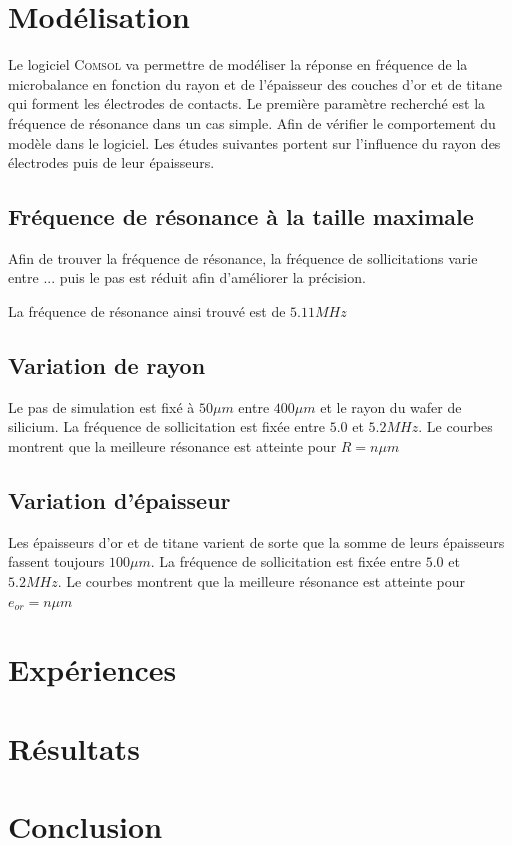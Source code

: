 \documentclass[a4paper,10pt]{article}
\begin{document}
\section{Modélisation}

Le logiciel \textsc{Comsol} va permettre de modéliser la réponse en fréquence de la microbalance en fonction du rayon et de l'épaisseur des couches d'or et de titane qui forment les électrodes de contacts.
Le première paramètre recherché est la fréquence de résonance dans un cas simple. Afin de vérifier le comportement du modèle dans le logiciel. Les études suivantes portent sur l'influence du rayon des électrodes puis de leur épaisseurs.
\subsection{Fréquence de résonance à la taille maximale}
Afin de trouver la fréquence de résonance, la fréquence de sollicitations varie entre ... puis le pas est réduit afin d'améliorer la précision.

La fréquence de résonance ainsi trouvé est de $5.11 MHz$
\subsection{Variation de rayon}

Le pas de simulation est fixé à $50 \mu m$ entre $400 \mu m$ et le rayon du wafer de silicium. La fréquence de sollicitation est fixée entre $5.0$ et $5.2 MHz$. %
Le courbes montrent que la meilleure résonance est atteinte pour $R=n \mu m$





\subsection{Variation d'épaisseur}

Les épaisseurs d'or et de titane varient de sorte que la somme de leurs épaisseurs fassent toujours $100 \mu m$. La fréquence de sollicitation est fixée entre $5.0$ et $5.2 MHz$. %
Le courbes montrent que la meilleure résonance est atteinte pour $e_{or}=n \mu m$



\section{Expériences}

\section{Résultats}

\section{Conclusion}
\end{document}
